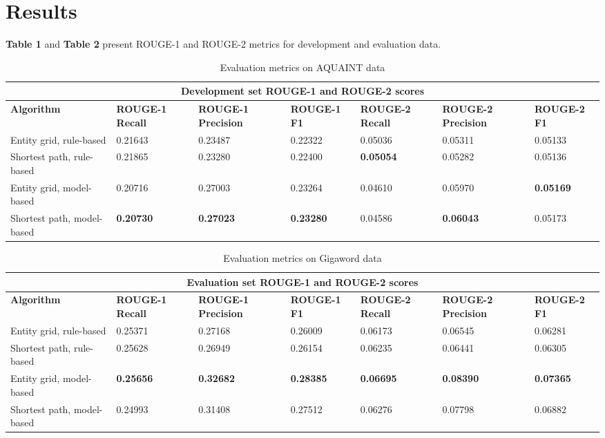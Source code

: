 \documentclass[11pt]{article}
\begin{document}
\section{Results}
\textbf{Table 1} and \textbf{Table 2} present ROUGE-1 and ROUGE-2 metrics for development and evaluation data.

\begin{table}[h]
\begin{tabular}{|p{4.3cm}||p{1.735cm}|p{1.78cm}|p{1.735cm}|p{1.735cm}|p{1.78cm}|p{1.735cm}| }
 \hline
 \multicolumn{7}{|c|}{Development set ROUGE-1 and ROUGE-2 scores} \\
 \hline
 \textbf{Algorithm} & \textbf{ROUGE-1 Recall} & \textbf{ROUGE-1 Precision} & \textbf{ROUGE-1 F1} & \textbf{ROUGE-2 Recall} & \textbf{ROUGE-2 Precision} & \textbf{ROUGE-2 F1}\\
 \hline
Entity grid, rule-based & 0.21643 & 0.23487 & 0.22322 & 0.05036 & 0.05311 & 0.05133 \\
Shortest path, rule-based & 0.21865 & 0.23280 & 0.22400 & \textbf{0.05054} & 0.05282 & 0.05136 \\
Entity grid, model-based & 0.20716 & 0.27003 & 0.23264 & 0.04610 & 0.05970 & \textbf{0.05169} \\
Shortest path, model-based & \textbf{0.20730} & \textbf{0.27023} & \textbf{0.23280} & 0.04586 & \textbf{0.06043} & 0.05173 \\
\hline
\end{tabular}
\caption{Evaluation metrics on AQUAINT data}
\label{tab:dev} 
\end{table}

\begin{table}[h]
\begin{tabular}{|p{4.3cm}||p{1.735cm}|p{1.78cm}|p{1.735cm}|p{1.735cm}|p{1.78cm}|p{1.735cm}| }
 \hline
 \multicolumn{7}{|c|}{Evaluation set ROUGE-1 and ROUGE-2 scores} \\
 \hline
 \textbf{Algorithm} & \textbf{ROUGE-1 Recall} & \textbf{ROUGE-1 Precision} & \textbf{ROUGE-1 F1} & \textbf{ROUGE-2 Recall} & \textbf{ROUGE-2 Precision} & \textbf{ROUGE-2 F1}\\
 \hline
Entity grid, rule-based & 0.25371 & 0.27168 & 0.26009 & 0.06173 & 0.06545 & 0.06281 \\
Shortest path, rule-based & 0.25628 & 0.26949 & 0.26154 & 0.06235 & 0.06441 & 0.06305 \\
Entity grid, model-based & \textbf{0.25656} & \textbf{0.32682} & \textbf{0.28385} & \textbf{0.06695} & \textbf{0.08390} & \textbf{0.07365} \\
Shortest path, model-based & 0.24993 & 0.31408 & 0.27512 & 0.06276 & 0.07798 & 0.06882 \\
\hline
\end{tabular}
\caption{Evaluation metrics on Gigaword data}
\label{tab:dev} 
\end{table}
\end{document}
